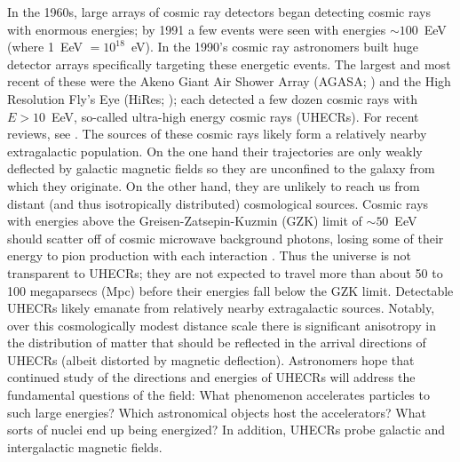 In the 1960s, large arrays of cosmic ray detectors began detecting cosmic rays
with enormous energies; by 1991 a few events were seen with energies $\sim
100$~EeV (where 1~EeV $=10^{18}$~eV).  In the 1990's cosmic ray astronomers
built huge detector arrays specifically targeting these energetic events.  The
largest and most recent of these were the Akeno Giant Air Shower Array (AGASA;
\cite{1992APh.....1...27C}) and the High Resolution Fly's Eye (HiRes;
\cite{2002NIMPA.482..457B}); each detected a few dozen cosmic rays with
$E>10$~EeV, so-called ultra-high energy cosmic rays (UHECRs). For recent
reviews, see \cite{KO11-UHECRs,LS11-UHECRs}.  The sources of
these cosmic rays likely form a relatively nearby extragalactic population. On
the one hand their trajectories are only weakly deflected by galactic magnetic
fields so they are unconfined to the galaxy from which they originate.  On the
other hand, they are unlikely to reach us from distant (and thus isotropically
distributed) cosmological sources.  Cosmic rays with energies above the
Greisen-Zatsepin-Kuzmin (GZK) limit of $\sim 50$~EeV  should scatter off of
cosmic microwave background photons, losing some of their energy to pion
production with each interaction
\cite{G66-GZK,ZK66-GZK}. Thus the universe is not
transparent to UHECRs; they are not expected to travel more than about 50 to
100 megaparsecs (Mpc) before their energies fall below the GZK limit. 
Detectable UHECRs likely emanate from relatively nearby extragalactic sources.
 Notably, over this cosmologically modest distance scale there is significant
anisotropy in the distribution of matter that should be reflected in the
arrival directions of UHECRs (albeit distorted by magnetic deflection). 
Astronomers hope that continued study of the directions and energies of UHECRs
will address the fundamental questions of the field: What phenomenon
accelerates particles to such large energies?  Which astronomical objects host
the accelerators?  What sorts of nuclei end up being energized?  In
addition, UHECRs probe galactic and intergalactic magnetic fields.

